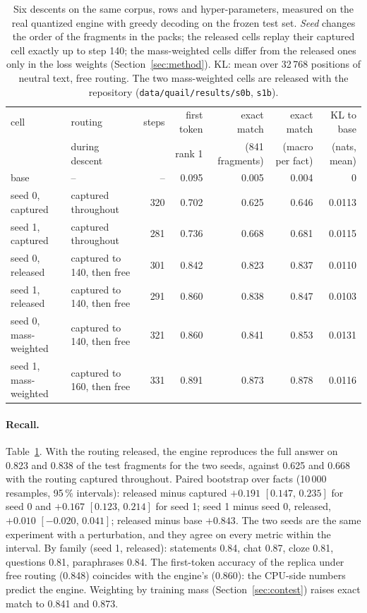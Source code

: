 \documentclass[10pt,a4paper]{article}
\begin{document}
\begin{table}[h]
\centering\footnotesize
\setlength{\tabcolsep}{4pt}
\begin{tabular}{@{}llrrrrr@{}}
\toprule
cell & routing & steps & first token & exact match & exact match & KL to base \\
 & during descent & & rank 1 & (841 fragments) & (macro per fact) & (nats, mean) \\
\midrule
base & -- & -- & 0.095 & 0.005 & 0.004 & 0 \\
seed 0, captured & captured throughout & 320 & 0.702 & 0.625 & 0.646 & 0.0113 \\
seed 1, captured & captured throughout & 281 & 0.736 & 0.668 & 0.681 & 0.0115 \\
seed 0, released & captured to 140, then free & 301 & 0.842 & 0.823 & 0.837 & 0.0110 \\
seed 1, released & captured to 140, then free & 291 & 0.860 & 0.838 & 0.847 & 0.0103 \\
seed 0, mass-weighted & captured to 140, then free & 321 & 0.860 & 0.841 & 0.853 & 0.0131 \\
seed 1, mass-weighted & captured to 160, then free & 331 & 0.891 & 0.873 & 0.878 & 0.0116 \\
\bottomrule
\end{tabular}
\caption{Six descents on the same corpus, rows and hyper-parameters, measured on the real
quantized engine with greedy decoding on the frozen test set. \emph{Seed} changes the
order of the fragments in the packs; the released cells replay their captured cell exactly
up to step 140; the mass-weighted cells differ from the released ones only in the loss
weights (Section~\ref{sec:method}). KL: mean over 32\,768 positions of neutral text, free
routing. The two mass-weighted cells are released with the repository
(\texttt{data/quail/results/s0b}, \texttt{s1b}).}
\label{tab:cells}
\end{table}

\paragraph{Recall.} Table~\ref{tab:cells}. With the routing released, the engine
reproduces the full answer on 0.823 and 0.838 of the test fragments for the two seeds,
against 0.625 and 0.668 with the routing captured throughout. Paired bootstrap over facts
(10\,000 resamples, 95\,\% intervals): released minus captured $+0.191$ $[0.147,\,0.235]$
for seed 0 and $+0.167$ $[0.123,\,0.214]$ for seed 1; seed 1 minus seed 0, released,
$+0.010$ $[-0.020,\,0.041]$; released minus base $+0.843$. The two seeds are the same
experiment with a perturbation, and they agree on every metric within the interval. By
family (seed 1, released): statements 0.84, chat 0.87, cloze 0.81, questions 0.81,
paraphrases 0.84. The first-token accuracy of the replica under free routing (0.848)
coincides with the engine's (0.860): the CPU-side numbers predict the engine.
Weighting by training mass (Section~\ref{sec:contest}) raises exact match to 0.841 and 0.873.
\end{document}

